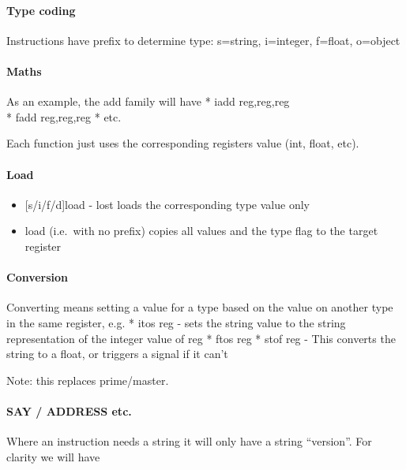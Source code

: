 \hypertarget{type-coding}{%
\paragraph{Type coding}\label{type-coding}}

Instructions have prefix to determine type: s=string, i=integer,
f=float, o=object

\hypertarget{maths}{%
\paragraph{Maths}\label{maths}}

As an example, the add family will have * iadd reg,reg,reg\\
* fadd reg,reg,reg * etc.

Each function just uses the corresponding registers value (int, float,
etc).

\hypertarget{load}{%
\paragraph{Load}\label{load}}

\begin{itemize}
\tightlist
\item
  {[}s/i/f/d{]}load - lost loads the corresponding type value only
\item
  load (i.e.~with no prefix) copies all values and the type flag to the
  target register
\end{itemize}

\hypertarget{conversion}{%
\paragraph{Conversion}\label{conversion}}

Converting means setting a value for a type based on the value on
another type in the same register, e.g. * itos reg - sets the string
value to the string representation of the integer value of reg * ftos
reg * stof reg - This converts the string to a float, or triggers a
signal if it can't

Note: this replaces prime/master.

\hypertarget{say-address-etc.}{%
\paragraph{SAY / ADDRESS etc.}\label{say-address-etc.}}

Where an instruction needs a string it will only have a string
``version''. For clarity we will have

